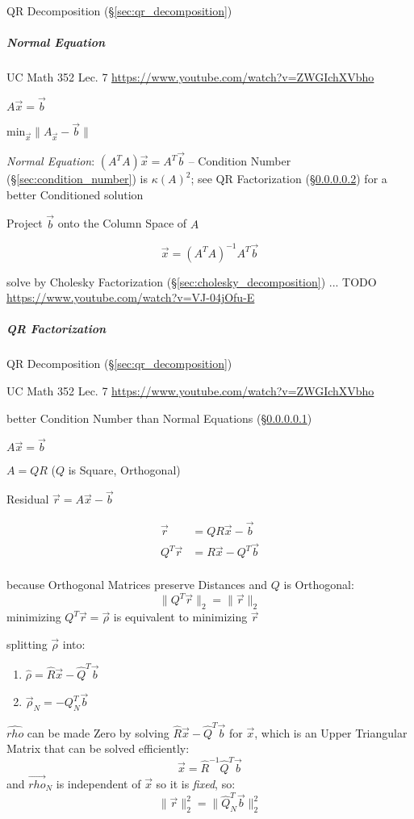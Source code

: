 QR Decomposition (\S\ref{sec:qr_decomposition})



\subparagraph{Normal Equation}\label{sec:normal_equation}\hfill

UC Math 352 Lec. 7 \url{https://www.youtube.com/watch?v=ZWGIchXVbho}

$A\vec{x} = \vec{b}$

$\mathrm{min}_{\vec{x}} \|A_{\vec{x}} - \vec{b}\|$

\emph{Normal Equation}: $(A^TA)\vec{x} = A^T\vec{b}$ -- Condition Number
(\S\ref{sec:condition_number}) is $\kappa(A)^2$; see QR Factorization
(\S\ref{sec:qr_factorization}) for a better Conditioned solution

Project $\vec{b}$ onto the Column Space of $A$

\[
  \vec{x} = (A^TA)^{-1}A^T\vec{b}
\]

solve by Cholesky Factorization (\S\ref{sec:cholesky_decomposition}) ... TODO
\url{https://www.youtube.com/watch?v=VJ-04jOfu-E}



\subparagraph{QR Factorization}\label{sec:qr_factorization}\hfill

QR Decomposition (\S\ref{sec:qr_decomposition})

UC Math 352 Lec. 7 \url{https://www.youtube.com/watch?v=ZWGIchXVbho}

better Condition Number than Normal Equations (\S\ref{sec:normal_equation})

$A\vec{x} = \vec{b}$

$A = QR$ ($Q$ is Square, Orthogonal)

Residual $\vec{r} = A\vec{x} - \vec{b}$

\begin{align*}
     \vec{r} & = QR\vec{x} - \vec{b} \\
  Q^T\vec{r} & = R\vec{x} - Q^T\vec{b} \\
\end{align*}

because Orthogonal Matrices preserve Distances and $Q$ is Orthogonal:
\[
  \|Q^T\vec{r}\|_2 = \|\vec{r}\|_2
\]
minimizing $Q^T\vec{r} = \vec{\rho}$ is equivalent to minimizing $\vec{r}$

splitting $\vec{\rho}$ into:
\begin{enumerate}
  \item $\hat{\rho}   = \hat{R}\vec{x} - \hat{Q}^T\vec{b}$
  \item $\vec{\rho}_N = -Q_N^T\vec{b}$
\end{enumerate}
$\hat{rho}$ can be made Zero by solving $\hat{R}\vec{x} - \hat{Q}^T\vec{b}$ for
$\vec{x}$, which is an Upper Triangular Matrix that can be solved efficiently:
\[
  \vec{x} = \hat{R}^{-1}\hat{Q}^T\vec{b}
\]
and $\vec{rho}_N$ is independent of $\vec{x}$ so it is \emph{fixed}, so:
\[
  \|\vec{r}\|^2_2 = \|\hat{Q}_N^T\vec{b}\|_2^2
\]



